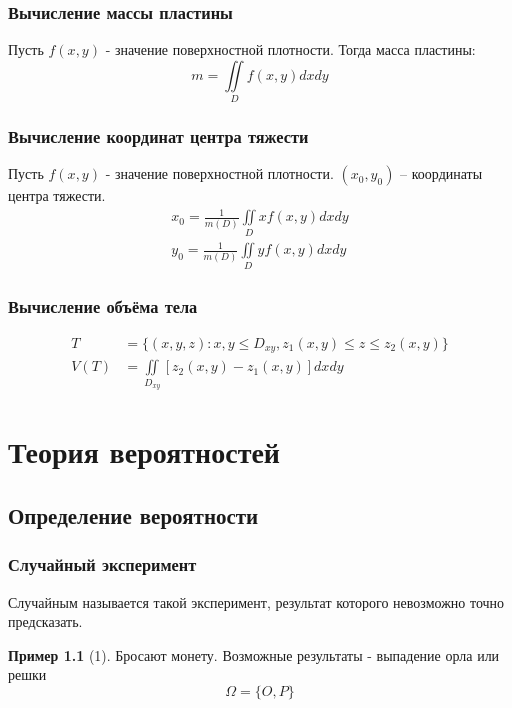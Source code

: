 \documentclass[a4paper, 14pt]{report}
\theoremstyle{definition}
\newtheorem*{example}{Пример}
\begin{document}
 		\subsection{Вычисление массы пластины}
 			Пусть $f(x,y)$ - значение поверхностной плотности. Тогда масса пластины:
 			\begin{equation}
 				m=\iint\limits_{D}f(x,y)dxdy
 			\end{equation}
 		
 		\subsection{Вычисление координат центра тяжести}
 			Пусть $f(x,y)$ - значение поверхностной плотности. $(x_0,y_0)$ -- координаты центра тяжести.
 			\begin{subequations}
 				\begin{align}
 					x_0=\frac{1}{m(D)}\iint\limits_{D}xf(x, y)dxdy \\
 					y_0=\frac{1}{m(D)}\iint\limits_{D}yf(x, y)dxdy
 				\end{align}
 			\end{subequations}
 		
 		\subsection{Вычисление объёма тела}
	 		\begin{subequations}
	 			\begin{align}
	 				T&=\{(x,y,z): x,y\le D_{xy},z_1(x,y)\le z\le z_2(x,y)\} \\
	 				V(T)&=\iint\limits_{D_{xy}}[z_2(x,y)-z_1(x,y)]dxdy
	 			\end{align}
	 		\end{subequations}
 			
\chapter{Теория вероятностей}
	\section{Определение вероятности}
		\subsection{Случайный эксперимент}
			Случайным называется такой эксперимент, результат которого невозможно точно предсказать.
			
			\begin{example}[1]
				Бросают монету. Возможные результаты - выпадение орла или решки
				\begin{equation}
					\Omega=\{O, P\}
				\end{equation}
			\end{example}
					
\end{document}
